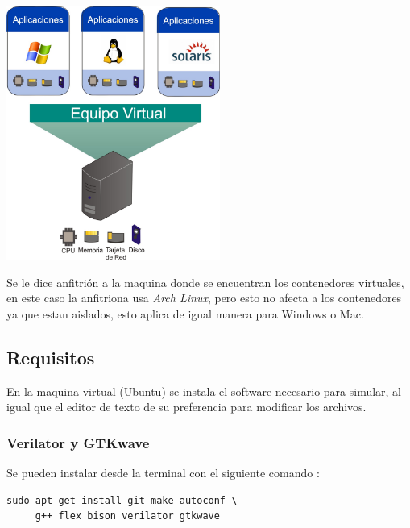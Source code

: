 \documentclass[11pt]{/home/hao/dev/org/latex-plantilla/IEEEtran}
\begin{document}
\begin{center}
\includegraphics[width=7cm]{virtualizacion.jpg}
\end{center}

Se le dice anfitrión a la maquina donde se encuentran los
contenedores virtuales, en este caso la anfitriona usa \emph{Arch Linux},
pero esto no afecta a los contenedores ya que estan aislados, esto
aplica de igual manera para Windows o Mac.
\subsection{Requisitos}
\label{sec:org00c4894}
En la maquina virtual (Ubuntu) se instala el software necesario
para simular, al igual que el editor de texto de su preferencia
para modificar los archivos.
\subsubsection{Verilator y GTKwave}
\label{sec:org004c2c5}
Se pueden instalar desde la terminal con el siguiente comando
\cite{verilator-instalacion}:
\begin{verbatim}
sudo apt-get install git make autoconf \
     g++ flex bison verilator gtkwave
\end{verbatim}



\end{document}
